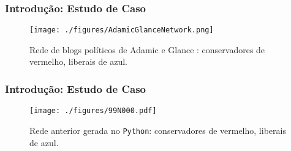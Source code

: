 \begin{frame}
  \frametitle{Introdução: Estudo de Caso}

  \begin{figure}
    \centering
    \texttt{[image: ./figures/AdamicGlanceNetwork.png]}
    \caption{Rede de blogs políticos de Adamic e Glance
      \cite{Adamic:2005:PoliticalBlogs}: conservadores de vermelho, liberais de
      azul.}
  \end{figure}
\end{frame}

\begin{frame}
  \frametitle{Introdução: Estudo de Caso}

  \begin{figure}
    \centering
    \vspace{-10mm}
    \texttt{[image: ./figures/99N000.pdf]}
    \vspace{-5mm}
    \caption{Rede anterior gerada no \texttt{Python}: conservadores de vermelho,
      liberais de azul.}
  \end{figure}
\end{frame}
